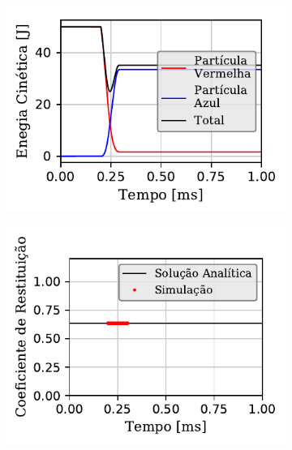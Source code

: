 \begin{figure}[H]
{\begin{subfigure}[t]{\smallresultsfigwidth}
		\end{subfigure}
		\begin{subfigure}[t]{\smallresultsfigwidth}
			\centering
			\includegraphics[scale=0.95]{images/colliding_spheres/dissipative/kineticEnergy_small_total_alternative.pdf}
			\caption{}
			\label{subfig:colliding_spheres:dissipative:kinetic_energy}
		\end{subfigure}
		\begin{subfigure}[t]{\smallresultsfigwidth}
			\centering
			\includegraphics[scale=0.95]{images/colliding_spheres/dissipative/coefficient_of_restitution_small.pdf}
			\caption{}
			\label{subfig:colliding_spheres:dissipative:coefficient_of_restitution}
		\end{subfigure}
	}
	\label{fig:colliding_spheres:dissipative:results}
	\sourceMe
\end{figure}

